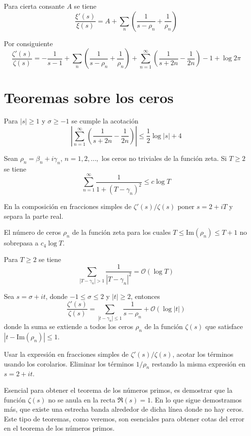 \documentclass[TAN.tex]{subfiles}
\begin{document}
\begin{coro}
Para cierta consante $A$ se tiene
\[ \frac{ξ'(s)}{ξ(s)} = A + \sum_n \left(\frac{1}{s-ρ_n} + \frac{1}{ρ_n}\right)\]

Por consiguiente
\[ \frac{ζ'(s)}{ζ(s)} = - \frac{1}{s-1} + \sum_n \left(\frac{1}{s-ρ_n} + \frac{1}{ρ_n}\right) + \sum_{n=1}^{∞} \left(\frac{1}{s+2n}-\frac{1}{2n}\right) - 1 + \log 2π\]
\end{coro}

\section{Teoremas sobre los ceros}
\begin{lemma}
Para $|s|≥1$ y $σ ≥ -1$ se cumple la acotación
\[ \left|\sum_{n=1}^{∞} \left(\frac{1}{s+2n}-\frac{1}{2n}\right)\right| ≤ \frac{1}{2} \log |s| + 4 \]
\end{lemma}

\begin{teorema}
Sean $ρ_n = β_n +i γ_n$, $n=1,2,\dots,$ los ceros no triviales de la función zeta. Si $T≥2$ se tiene
\[ \sum_{n=1}^{∞} \frac{1}{1+(T-γ_n)^2} ≤ c \log T \]
\end{teorema}

En la composición en fracciones simples de $ζ'(s)/ζ(s)$ poner $s = 2 + iT$ y separa la parte real.

\begin{coro}
El número de ceros $ρ_n$ de la función zeta para los cuales $T ≤ \text{Im}(ρ_n) ≤ T + 1$ no sobrepasa a $c_4 \log T$.
\end{coro}

\begin{coro}
Para $T≥2$ se tiene
\[ \sum_{|T-γ_n|>1} \frac{1}{|T-γ_n|^2} = \mathcal{O}(\log T) \]
\end{coro}

\begin{coro}
Sea $s = σ + it$, donde $-1≤σ≤2$ y $|t|≥2$, entonces
\[ \frac{ζ'(s)}{ζ(s)} = \sum_{|t-γ_n|≤1} \frac{1}{s-ρ_n} + \mathcal{O}(\log |t|) \]
donde la suma se extiende a todos los ceros $ρ_n$ de la función $ζ(s)$ que satisface $|t-\text{Im}(ρ_n)|≤1$.
\end{coro}

Usar la expresión en fracciones simples de $ζ'(s)/ζ(s)$, acotar los términos usando los corolarios. Eliminar los términos $1/ρ_n$ restando la misma expresión en $s = 2 + it$.

Esencial para obtener el teorema de los números primos, es demostrar que la función $ζ(s)$ no se anula en la recta $\Re(s)=1$. En lo que sigue demostramos más, que existe una estrecha banda alrededor de dicha línea donde no hay ceros. Este tipo de teoremas, como veremos, son esenciales para obtener cotas del error en el teorema de los números primos.
\end{document}
